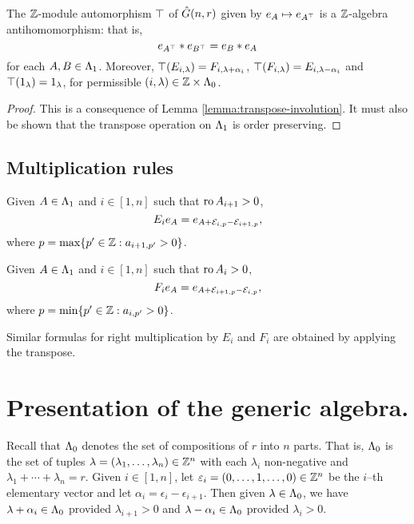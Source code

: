 \documentclass[a4paper, 11pt]{report}
\begin{document}
\begin{lemma}\label{lemma:transpose-involution-generic}
The $\mathbb{Z}$-module automorphism $\top$ of $\hat{G}(n,r)$ given by $e_A\mapsto e_{A^\top}$ is a $\mathbb{Z}$-algebra antihomomorphism: that is,
\begin{equation*}
e_{A^\top}\ast e_{B^\top} = e_B\ast e_A
\end{equation*}
for each $A,B\in{\Lambda_1}$. Moreover, $\top(E_{i,\lambda}) = F_{i,\lambda+\alpha_i}$, $\top(F_{i,\lambda}) = E_{i,\lambda - \alpha_i}$ and $\top(1_\lambda) = 1_\lambda$, for permissible $(i,\lambda)\in\mathbb{Z}\times{\Lambda_0}$.
\end{lemma}
\begin{proof}
This is a consequence of Lemma \ref{lemma:transpose-involution}. {\color{blue}It must also be shown that the transpose operation on ${\Lambda_1}$ is order preserving.}
\end{proof}

\subsection{Multiplication rules}

\begin{lemma}\label{lemma:multiplication-rule-generic}
Given $A\in{\Lambda_1}$ and $i\in[1,n]$ such that $\operatorname{ro}{A}_{i+1}>0$,
\begin{equation*}
E_ie_A = e_{A+\mathcal{E}_{i,p}-\mathcal{E}_{i+1,p}},
\end{equation*}
where $p=\max\{p'\in\mathbb{Z}: a_{i+1,p'}>0\}$.

Given $A\in{\Lambda_1}$ and $i\in[1,n]$ such that $\operatorname{ro}{A}_i>0$,
\begin{equation*}
F_ie_A = e_{A+\mathcal{E}_{i+1,p}-\mathcal{E}_{i,p}},
\end{equation*}
where $p=\min\{p'\in\mathbb{Z}: a_{i,p'}>0\}$.
\end{lemma}

Similar formulas for right multiplication by $E_i$ and $F_i$ are obtained by applying the transpose.

\section{Presentation of the generic algebra.}

Recall that ${\Lambda_0}$ denotes the set of compositions of $r$ into $n$ parts. That is, ${\Lambda_0}$ is the set of tuples $\lambda = (\lambda_1,\ldots,\lambda_n)\in\mathbb{Z}^n$ with each $\lambda_i$ non-negative and $\lambda_1 +\cdots +\lambda_n = r$. Given $i\in [1,n]$, let $\varepsilon_i = (0,\ldots,1,\ldots,0)\in\mathbb{Z}^n$ be the $i$--th elementary vector and let $\alpha_i = \epsilon_i - \epsilon_{i+1}$. Then given $\lambda\in{\Lambda_0}$, we have $\lambda + \alpha_i\in{\Lambda_0}$ provided $\lambda_{i+1}>0$ and $\lambda - \alpha_i\in{\Lambda_0}$ provided $\lambda_i>0$.
\end{document}
